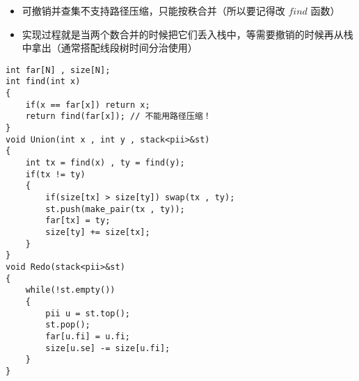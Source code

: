 \documentclass[E:/GsjzTle/main/main.tex]{subfiles}
\begin{document}
\begin{itemize}
\item
  可撤销并查集不支持路径压缩，只能按秩合并（所以要记得改 \(find\) 函数）
\item
  实现过程就是当两个数合并的时候把它们丢入栈中，等需要撤销的时候再从栈中拿出（通常搭配线段树时间分治使用）
\end{itemize}

\begin{lstlisting}
int far[N] , size[N];
int find(int x)
{
	if(x == far[x]) return x;
	return find(far[x]); // 不能用路径压缩！ 
}
void Union(int x , int y , stack<pii>&st)
{
	int tx = find(x) , ty = find(y);
	if(tx != ty) 
	{
		if(size[tx] > size[ty]) swap(tx , ty);
		st.push(make_pair(tx , ty));
		far[tx] = ty;
		size[ty] += size[tx];
	}
}
void Redo(stack<pii>&st)
{
	while(!st.empty())
	{
		pii u = st.top();
		st.pop();
		far[u.fi] = u.fi;
		size[u.se] -= size[u.fi];
	}
}
\end{lstlisting}
\end{document}
